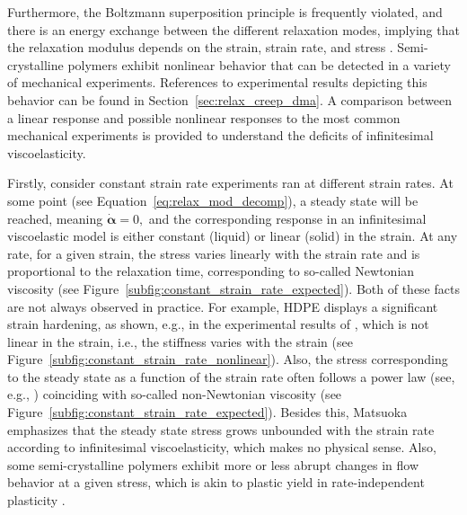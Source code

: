 Furthermore, the Boltzmann superposition principle is frequently violated, and there is an energy exchange between the different relaxation modes, implying that the relaxation modulus depends on the strain, strain rate, and stress \citep{malkinRheologyConceptsMethods2017}.
Semi-crystalline polymers exhibit nonlinear behavior that can be detected in a variety of mechanical experiments.
References to experimental results depicting this behavior can be found in Section~\ref{sec:relax_creep_dma}.
A comparison between a linear response and possible nonlinear responses to the most common mechanical experiments is provided to understand the deficits of infinitesimal viscoelasticity.

Firstly, consider constant strain rate experiments ran at different strain rates.
At some point (see Equation~\eqref{eq:relax_mod_decomp}), a steady state will be reached, meaning $\dot {\bm\alpha} = 0,$ and the corresponding response in an infinitesimal viscoelastic model is either constant (liquid) or linear (solid) in the strain.
At any rate, for a given strain, the stress varies linearly with the strain rate and is proportional to the relaxation time, corresponding to so-called Newtonian viscosity \citep{matsuokaThermodynamicTheoryViscoelasticity1996} (see Figure~\ref{subfig:constant_strain_rate_expected}).
Both of these facts are not always observed in practice.
For example, HDPE displays a significant strain hardening, as shown, e.g., in the experimental results of \cite{gsellYieldTransientEffects1981}, which is not linear in the strain, i.e., the stiffness varies with the strain (see Figure~\ref{subfig:constant_strain_rate_nonlinear}).
Also, the stress corresponding to the steady state as a function of the strain rate often follows a power law (see, e.g.,  \cite{gsellDeterminationPlasticBehaviour1979}) coinciding with so-called non-Newtonian viscosity (see Figure~\ref{subfig:constant_strain_rate_expected}).
Besides this, Matsuoka \citep{matsuokaThermodynamicTheoryViscoelasticity1996} emphasizes that the steady state stress grows unbounded with the strain rate according to infinitesimal viscoelasticity, which makes no physical sense.
Also, some semi-crystalline polymers exhibit more or less abrupt changes in flow behavior at a given stress, which is akin to plastic yield in rate-independent plasticity \citep{bergstromMechanicsSolidPolymers2015}.
